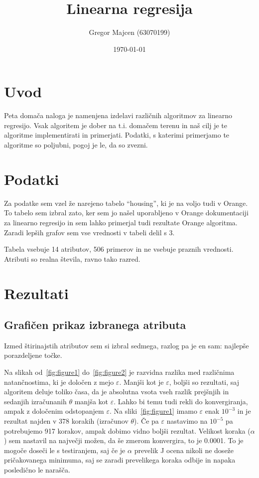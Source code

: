 \documentclass[a4paper,11pt]{article}
\title{Linearna regresija}
\author{Gregor Majcen (63070199)}
\date{\today}
\begin{document}
\maketitle

\section{Uvod}
Peta domača naloga je namenjena izdelavi različnih algoritmov za linearno regresijo. Vsak algoritem je dober na t.i. domačem terenu in naš cilj je te algoritme implementirati in primerjati. Podatki, s katerimi primerjamo te algoritme so poljubni, pogoj je le, da so zvezni.

\section{Podatki}
Za podatke sem vzel že narejeno tabelo “housing'', ki je na voljo tudi v Orange. To tabelo sem izbral zato, ker sem jo našel uporabljeno v Orange dokumentaciji za linearno regresijo in sem lahko primerjal tudi rezultate Orange algoritma. Zaradi lepših grafov sem vse vrednosti v tabeli delil s 3.

Tabela vsebuje 14 atributov, 506 primerov in ne vsebuje praznih vrednosti. Atributi so realna števila, ravno tako razred.

\section{Rezultati}

\subsection{Grafičen prikaz izbranega atributa}
Izmed štirinajstih atributov sem si izbral sedmega, razlog pa je en sam: najlepše porazdeljene točke.

Na slikah od~\ref{fig:figure1} do~\ref{fig:figure2} je razvidna razlika med različnima natančnostima, ki je določen z mejo $\varepsilon$. Manjši kot je $\varepsilon$, boljši so rezultati, saj algoritem deluje toliko časa, da je absolutna vsota vseh razlik prejšnjih in sedanjih izračunanih $\theta$ manjša kot $\varepsilon$. Lahko bi temu tudi rekli do konvergiranja, ampak z določenim odstopanjem $\varepsilon$. Na sliki~\ref{fig:figure1} imamo $\varepsilon$ enak $10^{-3}$ in je rezultat najden v 378 korakih (izračunov $\theta$). Če pa $\varepsilon$ nastavimo na $10^{-5}$ pa potrebujemo 917 korakov, ampak dobimo vidno boljši rezultat. Velikost koraka ($\alpha$) sem nastavil na največji možen, da še zmerom konvergira, to je 0.0001. To je mogoče doseči le s testiranjem, saj če je $\alpha$ prevelik J ocena nikoli ne doseže pričakovanega minimuma, saj se zaradi prevelikega koraka odbije in napaka posledično le narašča.
\end{document}
